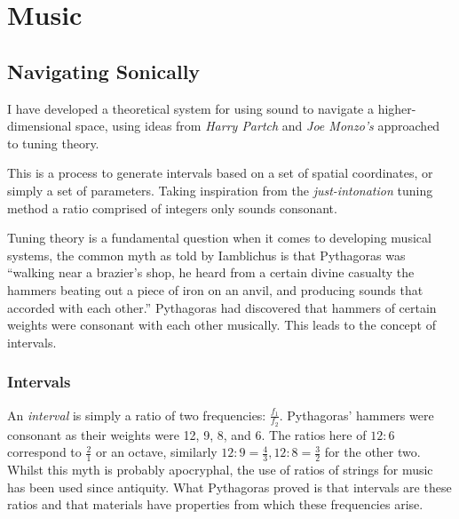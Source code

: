 \chapter{Music}
\label{Music}
\section{Navigating Sonically}
\label{sonicnav}
I have developed a theoretical system for using sound to navigate a
higher-dimensional space, using ideas from \emph{Harry Partch} and \emph{Joe
Monzo's} approached to tuning theory.

This is a process to generate intervals based on a set of spatial coordinates,
or simply a set of parameters. Taking inspiration from the
\emph{just-intonation} tuning method a ratio comprised of integers only sounds
consonant.

Tuning theory is a fundamental question when it comes to developing musical
systems, the common myth as told by Iamblichus is that Pythagoras was ``walking
near a brazier's shop, he heard from a certain divine casualty the hammers
beating out a piece of iron on an anvil, and producing sounds that accorded with
each other.'' \citep[p.62]{iamblichus} Pythagoras had discovered that hammers of
certain weights were consonant with each other musically. This leads to the
concept of intervals.

\subsection{Intervals}
An \emph{interval} is simply a ratio of two frequencies: $\frac{f_1}{f_2}$.
Pythagoras' hammers were consonant as their weights were 12, 9, 8, and 6.  The
ratios here of $12:6$ correspond to $\frac{2}{1}$ or an octave, similarly $12:9
= \frac{4}{3}, 12:8 = \frac{3}{2}$ for the other two. Whilst this myth is
probably apocryphal, the use of ratios of strings for music has been used since
antiquity. What Pythagoras proved is that intervals are these ratios and that
materials have properties from which these frequencies arise.

